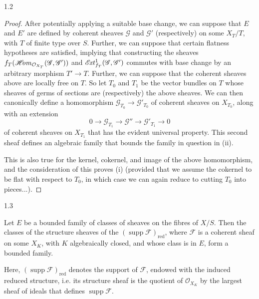 \begin{proposition}{1.2}
\begin{enumerate}
    \end{enumerate}\begin{proof}\par{}After potentially applying a suitable base change, we can suppose that \(E\) and \(E'\) are defined by coherent sheaves \(\mathscr {G}\) and \(\mathscr {G}'\) (respectively) on some \(X_T/T\), with \(T\) of finite type over \(S\).
      Further, we can suppose that certain flatness hypotheses are satisfied, implying that constructing the sheaves \(f_T(\mathscr {H}\kern  -2.5pt\mathit {om}_{\mathcal {O}_{X_T}}(\mathscr {G},\mathscr {G}'))\) and \(\mathscr {E}\kern  -1.5pt\mathit {xt}_{f_T}^1(\mathscr {G},\mathscr {G}')\) commutes with base change by an arbitrary morphism \(T'\to  T\).
      Further, we can suppose that the coherent sheaves above are locally free on \(T\).
      So let \(T_0\) and \(T_1\) be the vector bundles on \(T\) whose sheaves of germs of sections are (respectively) the above sheaves.
      We can then canonically define a homomorphism \(\mathscr {G}_{T_0}\to \mathscr {G}'_{T_0}\) of coherent sheaves on \(X_{T_0}\), along with an extension
      \[         0 \to  \mathscr {G}_{T_1} \to  \mathscr {G}'' \to  \mathscr {G}'_{T_1} \to  0       \]
      of coherent sheaves on \(X_{T_1}\) that has the evident universal property.
      This second sheaf defines an algebraic family that bounds the family in question in (ii).
      
      This is also true for the kernel, cokernel, and image of the above homomorphism, and the consideration of this proves (i) (provided that we assume the cokernel to be flat with respect to \(T_0\), in which case we can again reduce to cutting \(T_0\) into pieces...).\end{proof}\end{proposition}\begin{proposition}{1.3}\label{fga3.iv-1-proposition-1.3}\skipsinglepar\par{}Let \(E\) be a bounded family of classes of sheaves on the fibres of \(X/S\).
    Then the classes of the structure sheaves of the \((\operatorname {supp}\mathscr {F})_\mathrm {red}\), where \(\mathscr {F}\) is a coherent sheaf on some \(X_K\), with \(K\) algebraically closed, and whose class is in \(E\), form a bounded family.\end{proposition}\par{}Here, \((\operatorname {supp}\mathscr {F})_\mathrm {red}\) denotes the support of \(\mathscr {F}\), endowed with the induced reduced structure, i.e. its structure sheaf is the quotient of \(\mathcal {O}_{X_K}\) by the largest sheaf of ideals that defines \(\operatorname {supp}\mathscr {F}\).
